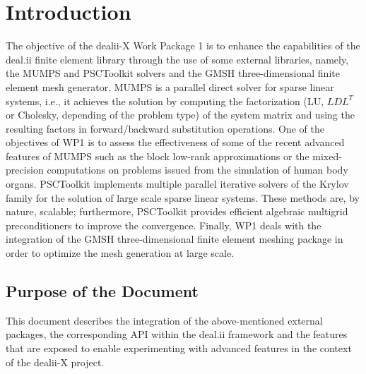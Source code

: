 \documentclass[a4paper,12pt]{article}
\begin{document}
\vspace*{2cm}

\disclaimer

\newpage

\tableofcontents %

\newpage

\section{{Introduction}}

The objective of the dealii-X Work Package 1 is to enhance the
capabilities of the deal.ii finite element library through the use of
some external libraries, namely, the MUMPS and PSCToolkit solvers and
the GMSH three-dimensional finite element mesh generator. MUMPS is a
parallel direct solver for sparse linear systems, i.e., it achieves
the solution by computing the factorization (LU, $LDL^T$ or Cholesky,
depending of the problem type) of the system matrix and using the
resulting factors in forward/backward substitution operations. One of
the objectives of WP1 is to assess the effectiveness of some of the
recent advanced features of MUMPS such as the block low-rank
approximations or the mixed-precision computations on problems issued
from the simulation of human body organs. PSCToolkit implements
multiple parallel iterative solvers of the Krylov family for the
solution of large scale sparse linear systems. These methods are, by
nature, scalable; furthermore, PSCToolkit provides efficient algebraic
multigrid preconditioners to improve the convergence. Finally, WP1
deals with the integration of the GMSH three-dimensional finite
element meshing package in order to optimize the mesh generation at
large scale. 

\subsection{{Purpose of the Document}}
This document describes the integration of the above-mentioned
external packages, the corresponding API within the deal.ii framework
and the features that are exposed to enable experimenting with
advanced features in the context of the dealii-X project. 

\end{document}
